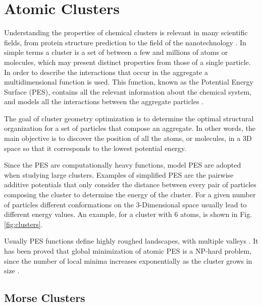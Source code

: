 \chapter{Atomic Clusters}

Understanding the properties of chemical clusters is relevant in many scientific fields, from protein structure prediction to the field of the nanotechnology \cite{wales97}. In simple terms a cluster is a set of between a few and millions of atoms or molecules, which may present distinct properties from those of a single particle. In order to describe the interactions that occur in the aggregate a multidimensional function is used. This function, known as the Potential Energy Surface (PES), contains all the relevant information about the chemical system, and models all the interactions between the aggregate particles \cite{doye06}.

The goal of cluster geometry optimization is to determine the optimal structural organization for a set of particles that compose an aggregate. In other words, the main objective is to discover the position of all the atoms, or molecules, in a 3D space so that it corresponds to the lowest potential energy.

Since the PES are computationally heavy functions, model PES are adopted when studying large clusters. Examples of simplified PES are the pairwise additive potentials that only consider the distance between every pair of particles composing the cluster to determine the energy of the cluster. For a given number of particles different conformations on the 3-Dimensional space usually lead to different energy values. An example, for a cluster with 6 atoms, is shown in Fig. \ref{fig:clusters}.


\pagebreak

Usually PES functions define highly roughed landscapes, with multiple valleys \cite{stillinger99}. It has been proved that global minimization of atomic PES is a NP-hard problem, since the number of local minima increases exponentially as the cluster grows in size \cite{doye98, wille85}.




	\section{Morse Clusters}
	

